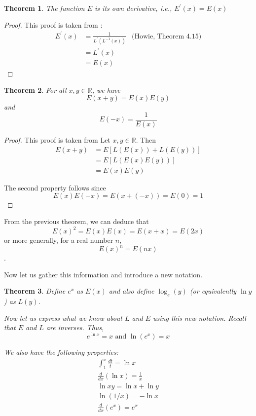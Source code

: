 \documentclass[12pt]{article}
\theoremstyle{mystyle}
\newtheorem{thm}{Theorem}
\newcommand{\R}{\mathbb{R}}
\begin{document}
\begin{thm}
  The function $E$ is its own derivative, i.e., $E^\prime(x) = E(x)$
\end{thm}
\begin{proof}
  This proof is taken from \cite[p. 168]{howie}:
  \begin{align*}
    E^\prime(x) 
        &= \frac{1}{L^\prime(L^{-1}(x))}  & \text{(Howie, Theorem 4.15)} \\
        &= L^\prime(x) \\
        &= E(x)
  \end{align*}
\end{proof}


\begin{thm}
  For all $x,y \in \R$, we have
  $$ E(x+y) = E(x)E(y) $$
  and
  $$ E(-x) = \frac{1}{E(x)}$$
\end{thm}
\begin{proof}
  This proof is taken from \cite[Theorem 6.2]{howie}
  Let $x,y \in \R$. Then
  \begin{align*}
    E(x+y) &= E[L(E(x)) + L(E(y))] \\
           &= E[L(E(x)E(y))] \\
           &= E(x)E(y)
  \end{align*}
  
  The second property follows since
  $$ E(x)E(-x) = E(x +(-x)) = E(0) = 1 $$
\end{proof}


From the previous theorem, we can deduce that
  $$E(x)^2 = E(x)E(x) = E(x+x) = E(2x)$$
or more generally, for a real number $n$,
  $$ E(x)^n = E(nx)$$.

Now let us gather this information and introduce a new notation.

\begin{thm}
  Define $e^x$ as $E(x)$ and also define $\log_e (y)$ (or equivalently $\ln y$)
  as $L(y)$.
  
  Now let us express what we know about $L$ and $E$ using this new notation.
  Recall that $E$ and $L$ are inverses. Thus,
  $$ e^{\ln x} = x \text{ and } \ln(e^x) = x $$
  
  We also have the following properties:
  \begin{align*}
    \int_{1}^x \frac{dt}{t} = \ln x \\
    \frac{d}{dx}(\ln x) = \frac{1}{x} \\
    \ln xy = \ln x + \ln y \\
    \ln(1/x) = - \ln x \\
    \frac{d}{dx}(e^x) = e^x \\
  \end{align*}
\end{thm}
\end{document}

